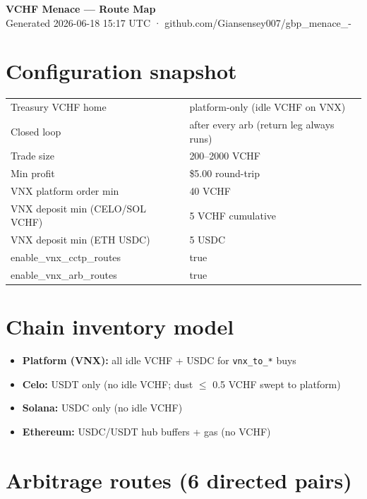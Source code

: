 \documentclass[11pt,a4paper]{article}
\begin{document}
\begin{center}
{\LARGE\bfseries\color{accent} VCHF Menace --- Route Map}\\[6pt]
{\color{muted}\small Generated 2026-06-18 15:17 UTC · github.com/Giansensey007/gbp\_menace\_-}\\[12pt]
\end{center}
\section*{Configuration snapshot}
\begin{tabular}{@{}ll@{}}
Treasury VCHF home & platform-only (idle VCHF on VNX) \\
Closed loop & after every arb (return leg always runs) \\
Trade size & 200--2000 VCHF \\
Min profit & \$5.00 round-trip \\
VNX platform order min & 40 VCHF \\
VNX deposit min (CELO/SOL VCHF) & 5 VCHF cumulative \\
VNX deposit min (ETH USDC) & 5 USDC \\
enable\_vnx\_cctp\_routes & true \\
enable\_vnx\_arb\_routes & true \\
\end{tabular}
\section*{Chain inventory model}
\begin{itemize}[nosep]
\item \textbf{Platform (VNX):} all idle VCHF + USDC for \texttt{vnx\_to\_*} buys
\item \textbf{Celo:} USDT only (no idle VCHF; dust $\leq$ 0.5 VCHF swept to platform)
\item \textbf{Solana:} USDC only (no idle VCHF)
\item \textbf{Ethereum:} USDC/USDT hub buffers + gas (no VCHF)
\end{itemize}
\section*{Arbitrage routes (6 directed pairs)}
\end{document}
